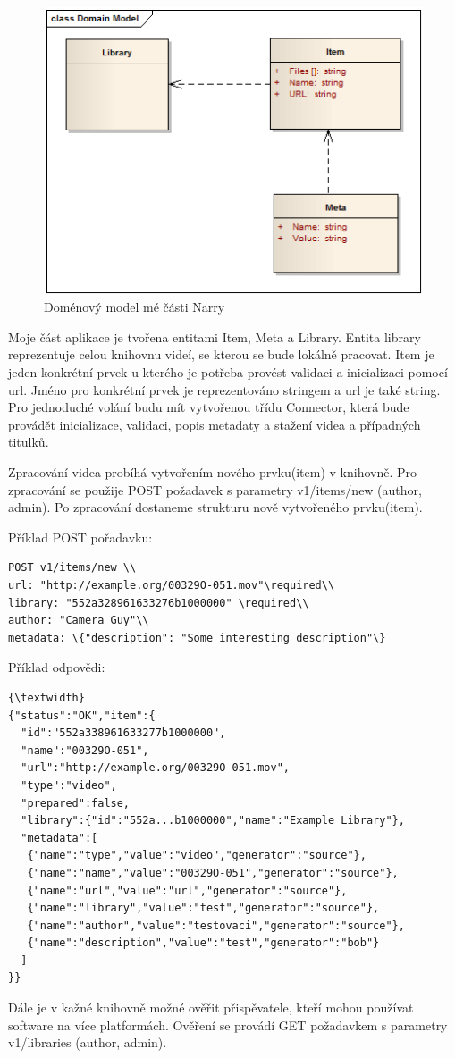 \begin{figure}[H]
\includegraphics[width=1\textwidth]{./obrazova_priloha/domain_my.png}
\caption{Doménový model mé části Narry}
\end{figure}
\par Moje část aplikace je tvořena entitami Item, Meta a Library. Entita library reprezentuje celou knihovnu videí, se kterou se bude lokálně pracovat. Item je jeden konkrétní prvek u kterého je potřeba provést validaci a inicializaci pomocí url. Jméno pro konkrétní prvek je reprezentováno stringem a url je také string. Pro jednoduché volání budu mít vytvořenou třídu Connector, která bude provádět inicializace, validaci, popis metadaty a stažení videa a případných titulků.
\par Zpracování videa probíhá vytvořením nového prvku(item) v knihovně. Pro zpracování se použije POST požadavek s parametry v1/items/new (author, admin). Po zpracování dostaneme strukturu nově vytvořeného prvku(item).
\par Příklad POST pořadavku\cite{narra_en}:
\begin{verbatim} 
POST v1/items/new \\
url: "http://example.org/00329O-051.mov"\required\\
library: "552a328961633276b1000000" \required\\
author: "Camera Guy"\\
metadata: \{"description": "Some interesting description"\}
\end{verbatim}
\par Příklad odpovědi:
\begin{verbatim}{\textwidth}
{"status":"OK","item":{
  "id":"552a338961633277b1000000",
  "name":"00329O-051",
  "url":"http://example.org/00329O-051.mov",
  "type":"video",
  "prepared":false,
  "library":{"id":"552a...b1000000","name":"Example Library"},
  "metadata":[
   {"name":"type","value":"video","generator":"source"},
   {"name":"name","value":"00329O-051","generator":"source"},
   {"name":"url","value":"url","generator":"source"},
   {"name":"library","value":"test","generator":"source"},
   {"name":"author","value":"testovaci","generator":"source"},
   {"name":"description","value":"test","generator":"bob"}
  ]
}}
\end{verbatim}
\par Dále je v kažné knihovně možné ověřit přispěvatele, kteří mohou používat software na více platformách. Ověření se provádí GET požadavkem s parametry v1/libraries (author, admin). 